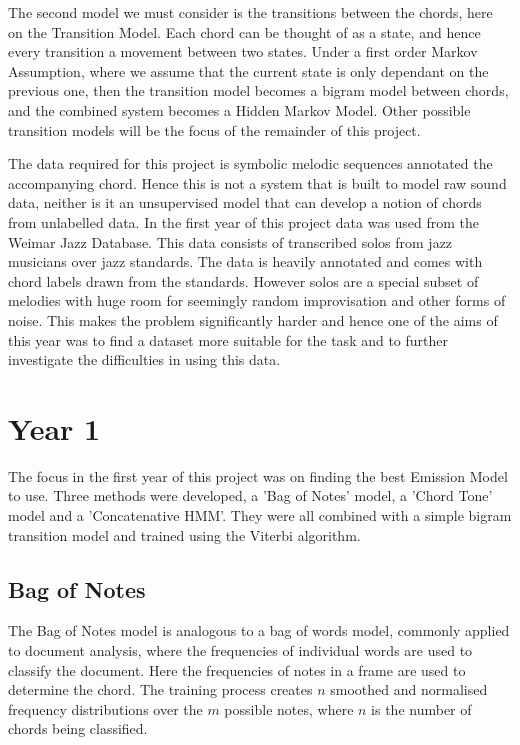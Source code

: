 \documentclass[bsc,singlespacing,logo, parskip, deptreport]{infthesis}
\begin{document}
The second model we must consider is the transitions between the chords, here on the Transition Model. Each chord can be thought of as a state, and hence every transition a movement between two states. Under a first order Markov Assumption, where we assume that the current state is only dependant on the previous one, then the transition model becomes a bigram model between chords, and the combined system becomes a Hidden Markov Model. Other possible transition models will be the focus of the remainder of this project. 

The data required for this project is symbolic melodic sequences annotated the accompanying chord. Hence this is not a system that is built to model raw sound data, neither is it an unsupervised model that can develop a notion of chords from unlabelled data. In the first year of this project data was used from the Weimar Jazz Database. This data consists of transcribed solos from jazz musicians over jazz standards. The data is heavily annotated and comes with chord labels drawn from the standards. However solos are a special subset of melodies with huge room for seemingly random improvisation and other forms of noise. This makes the problem significantly harder and hence one of the aims of this year was to find a dataset more suitable for the task and to further investigate the difficulties in using this data. 

\chapter{Year 1}

The focus in the first year of this project was on finding the best Emission Model to use. Three methods were developed, a 'Bag of Notes' model, a 'Chord Tone' model and a 'Concatenative HMM'. They were all combined with a simple bigram transition model and trained using the Viterbi algorithm.

\section{Bag of Notes}

The Bag of Notes model is analogous to a bag of words model, commonly applied to document analysis, where the frequencies of individual words are used to classify the document. Here the frequencies of notes in a frame are used to determine the chord. The training process creates $n$ smoothed and normalised frequency distributions over the $m$ possible notes, where $n$ is the number of chords being classified. 
\end{document}
